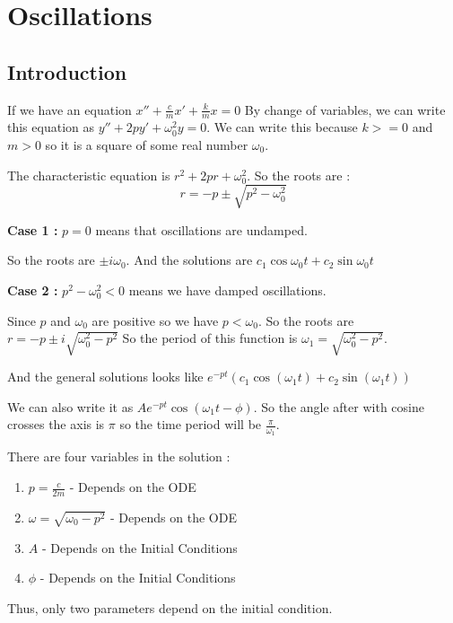 

\chapter{Oscillations}

\bigbreak

\section{Introduction}

If we have an equation $x'' + \frac{c}{m} x' + \frac{k}{m} x = 0$
By change of variables, we can write this equation as $ y'' + 2p y' + \omega_0^2 y = 0 $.
We can write this because $k >= 0$ and $m > 0$ so it is a square of some real number $\omega_0$.

The characteristic equation is  $r^2 + 2p r +  \omega_0^2$.
So the roots are :
$$ r = -p \pm \sqrt{p^2 - \omega_0^2} $$

{\bf Case 1 : } $p = 0$ means that oscillations are undamped.

So the roots are  $\pm i \omega_0$.
And the solutions are $c_1\cos \omega_0 t + c_2 \sin \omega_0 t$

{\bf Case 2 : } $p^2 - \omega_0^2 < 0$ means we have damped oscillations.

Since $p$ and $\omega_0$ are positive so we have $p < \omega_0$.
So the roots are $r = -p \pm i \sqrt{\omega_0^2 - p^2}$
So the period of this function is $\omega_1 = \sqrt{\omega_0^2 - p^2}$.

And the general solutions looks like $e^{-pt}(c_1 \cos (\omega_1 t) + c_2 \sin (\omega_1 t))$

We can also write it as $Ae^{-pt}\cos(\omega_1 t - \phi)$.
So the angle after with cosine crosses the axis is $\pi$ so the time period will be $\frac{\pi}{\omega_1}$.

There are four variables in the solution :
\begin{enumerate}
    \item $p = \frac{c}{2m}$ - Depends on the ODE
    \item $\omega = \sqrt{\omega_0 - p^2}$  - Depends on the ODE
    \item $A$ - Depends on the Initial Conditions
    \item $\phi$ - Depends on the Initial Conditions
\end{enumerate}

Thus, only two parameters depend on the initial condition.

